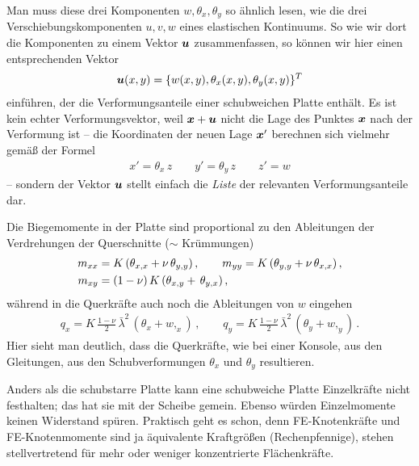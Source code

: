 Man muss diese drei Komponenten $w, \theta_x, \theta_y$ so \"{a}hnlich lesen, wie die drei Verschiebungskomponenten $u, v, w$ eines elastischen Kontinuums. So wie wir dort die Komponenten zu einem Vektor $\mbox{\boldmath $u$}$ zusammenfassen, so k\"{o}nnen wir hier einen entsprechenden Vektor
\begin{align}\label{A51Vektor}
\mbox{\boldmath $u$}(x,y) = \{ w(x,y), \theta_x(x,y), \theta_y(x,y) \}^T
\end{align}
einf\"{u}hren, der die Verformungsanteile einer schubweichen Platte enth\"{a}lt. Es ist kein echter Verformungsvektor, weil $\mbox{\boldmath $x$} + \mbox{\boldmath $u$}$ nicht die Lage des Punktes $\mbox{\boldmath $x$}$ nach der Verformung ist -- die Koordinaten der neuen Lage $\mbox{\boldmath $x$}'$ berechnen sich vielmehr gem\"{a}{\ss} der Formel
\begin{align}
x' =  \theta_x \, z \qquad y' =  \theta_y \, z \qquad z' =  w
\end{align}
-- sondern der Vektor $\mbox{\boldmath $u$}$ stellt einfach die {\em Liste} der relevanten Verformungsanteile dar.

Die Biegemomente in der Platte sind proportional zu den Ableitungen der Verdrehungen der Querschnitte ($\sim$ Kr\"{u}mmungen)
\begin{align} \label{Momente1}
    m_{xx} &= K\,(\theta_{x,x} + \nu \,\theta_{y,y})\,, \qquad    m_{yy} =
K\,(\theta_{y,y} + \nu \,\theta_{x,x})\,, \nonumber \\
    m_{xy} &= (1-\nu)\, K \,(\theta_{x,y} + \, \theta_{y,x})\,,
\end{align}
w\"{a}hrend in die Querkr\"{a}fte auch noch die Ableitungen von $w$ eingehen
\begin{align}
q_x = K \,\frac{1 - \nu}{2}\, \bar{\lambda}^2\, (\theta_x + w,_x)\,, \qquad q_y = K\,
\frac{1 - \nu}{2}\, \bar{\lambda}^2\, (\theta_y + w,_y) \,.
\end{align}
Hier sieht man deutlich, dass die Querkr\"{a}fte, wie bei einer Konsole, aus den Gleitungen, aus den Schubverformungen $\theta_x$ und $\theta_y$ resultieren.

Anders als die schubstarre Platte kann eine schubweiche Platte Einzelkr\"{a}fte nicht
festhalten; das hat sie mit der Scheibe gemein. Ebenso w\"{u}rden Einzelmomente keinen Widerstand sp\"{u}ren. Praktisch geht es schon, denn FE-Knotenkr\"{a}fte und FE-Knotenmomente sind ja \"{a}quivalente Kraftgr\"{o}{\ss}en (\glq Rechenpfennige\grq), stehen stellvertretend f\"{u}r mehr oder weniger konzentrierte Fl\"{a}chenkr\"{a}fte.

